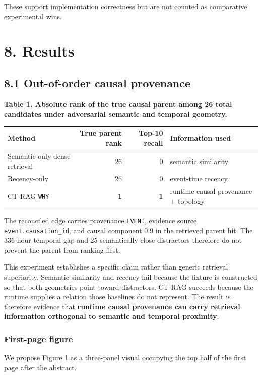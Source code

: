 \documentclass[
  11pt,
]{article}
\begin{document}
These support implementation correctness but are not counted as
comparative experimental wins.

\section{8. Results}\label{results}

\subsection{8.1 Out-of-order causal
provenance}\label{out-of-order-causal-provenance}

\textbf{Table 1. Absolute rank of the true causal parent among 26 total
candidates under adversarial semantic and temporal geometry.}

\begin{longtable}[]{@{}lrrl@{}}
\toprule\noalign{}
Method & True parent rank & Top-10 recall & Information used \\
\midrule\noalign{}
\endhead
\bottomrule\noalign{}
\endlastfoot
Semantic-only dense retrieval & 26 & 0 & semantic similarity \\
Recency-only & 26 & 0 & event-time recency \\
CT-RAG \texttt{WHY} & \textbf{1} & \textbf{1} & runtime causal
provenance + topology \\
\end{longtable}

The reconciled edge carries provenance \texttt{EVENT}, evidence source
\texttt{event.causation\_id}, and causal component 0.9 in the retrieved
parent hit. The 336-hour temporal gap and 25 semantically close
distractors therefore do not prevent the parent from ranking first.

This experiment establishes a specific claim rather than generic
retrieval superiority. Semantic similarity and recency fail because the
fixture is constructed so that both geometries point toward distractors.
CT-RAG succeeds because the runtime supplies a relation those baselines
do not represent. The result is therefore evidence that \textbf{runtime
causal provenance can carry retrieval information orthogonal to semantic
and temporal proximity}.

\subsubsection{First-page figure}\label{first-page-figure}

We propose Figure 1 as a three-panel visual occupying the top half of
the first page after the abstract.
\end{document}
